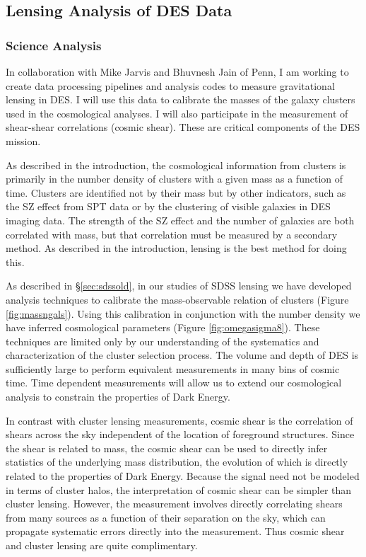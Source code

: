\documentclass[12pt]{article}
\begin{document}
\subsection{Lensing Analysis of DES Data} \label{sec:deslensing}

\subsubsection{Science Analysis}

In collaboration with Mike Jarvis and Bhuvnesh Jain of Penn, I am working to
create data processing pipelines and analysis codes to measure gravitational
lensing in DES.  I will use this data to calibrate the masses of the galaxy
clusters used in the cosmological analyses.  I will also participate in the
measurement of shear-shear correlations (cosmic shear).  These are critical
components of the DES mission.

As described in the introduction, the cosmological information from clusters is
primarily in the number density of clusters with a given mass as a function of
time.  Clusters are identified not by their mass but by other indicators, such
as the SZ effect from SPT data or by the clustering of visible galaxies in DES
imaging data.  The strength of the SZ effect and the number of galaxies are
both correlated with mass, but that correlation must be measured by a secondary
method.  As described in the introduction, lensing is the best method for doing
this.  

As described in \S\ref{sec:sdssold}, in our studies of SDSS lensing we have
developed analysis techniques to calibrate the mass-observable relation of
clusters (Figure \ref{fig:massngals}).  Using this calibration in conjunction
with the number density we have inferred cosmological parameters (Figure
\ref{fig:omegasigma8}).  These techniques are limited only by our understanding
of the systematics and characterization of the cluster selection process.  The
volume and depth of DES is sufficiently large to perform equivalent
measurements in many bins of cosmic time.  Time dependent measurements will
allow us to extend our cosmological analysis to constrain the properties of
Dark Energy.

In contrast with cluster lensing measurements, cosmic shear is the correlation
of shears across the sky independent of the location of foreground structures.
Since the shear is related to mass, the cosmic shear can be used to directly
infer statistics of the underlying mass distribution, the evolution of which is
directly related to the properties of Dark Energy.  Because the signal need not
be modeled in terms of cluster halos, the interpretation of cosmic shear can be
simpler than cluster lensing.  However, the measurement involves directly
correlating shears from many sources as a function of their separation on the
sky, which can propagate systematic errors directly into the measurement. Thus
cosmic shear and cluster lensing are quite complimentary.
\end{document}

